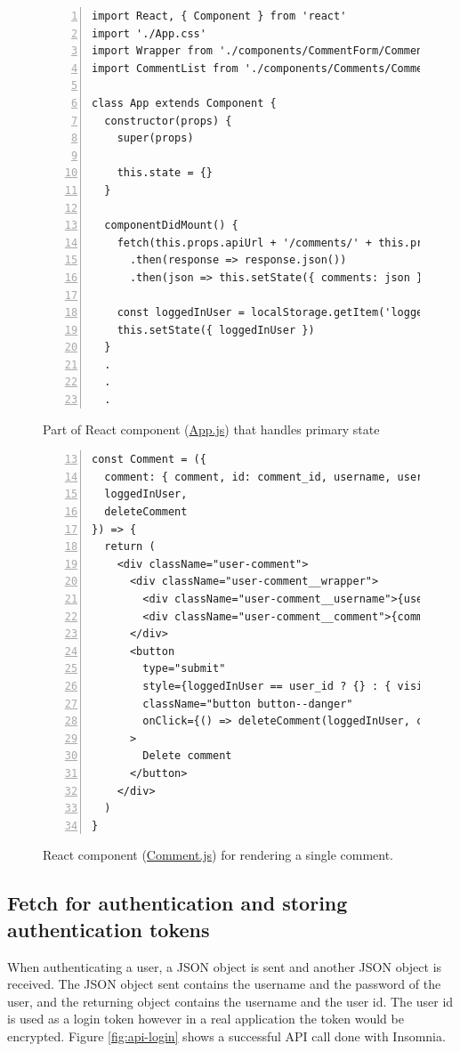 \documentclass[a4paper]{scrartcl}
\begin{document}
\begin{figure}
	\begin{lstlisting}[frame=single, numbers=left, breaklines=true, basicstyle=\ttfamily\footnotesize, firstnumber=1]
import React, { Component } from 'react'
import './App.css'
import Wrapper from './components/CommentForm/CommentFormWrapper'
import CommentList from './components/Comments/Comment'

class App extends Component {
  constructor(props) {
    super(props)

    this.state = {}
  }

  componentDidMount() {
    fetch(this.props.apiUrl + '/comments/' + this.props.recipeId)
      .then(response => response.json())
      .then(json => this.setState({ comments: json }))

    const loggedInUser = localStorage.getItem('loggedInUser')
    this.setState({ loggedInUser })
  }
  .
  .
  .
	\end{lstlisting}
	\caption{Part of React component  (\href{https://github.com/juliuscc/kth-id1354/blob/master/homework-4/front-end/tasty_temp/src/App.js}{App.js}) that handles primary state}
	\label{fig:react-container}
\end{figure}

\begin{figure}
\begin{lstlisting}[frame=single, numbers=left, breaklines=true, basicstyle=\ttfamily\footnotesize, firstnumber=13]
const Comment = ({
  comment: { comment, id: comment_id, username, user_id },
  loggedInUser,
  deleteComment
}) => {
  return (
    <div className="user-comment">
      <div className="user-comment__wrapper">
        <div className="user-comment__username">{username}</div>
        <div className="user-comment__comment">{comment}</div>
      </div>
      <button
        type="submit"
        style={loggedInUser == user_id ? {} : { visibility: 'hidden' }}
        className="button button--danger"
        onClick={() => deleteComment(loggedInUser, comment_id)}
      >
        Delete comment
      </button>
    </div>
  )
}
\end{lstlisting}
	\caption{React component (\href{https://github.com/juliuscc/kth-id1354/blob/f811132bd5cd1c4ac30e0b60e7a2f64143a6d152/homework-4/front-end/tasty-app/components/Comments/Comment.js\#L13}{Comment.js}) for rendering a single comment.}
	\label{fig:react-component}
\end{figure}

\subsection{Fetch for authentication and storing authentication tokens}
When authenticating a user, a JSON object is sent and another JSON object is received. The JSON object sent contains the username and the password of the user, and the returning object contains the username and the user id. The user id is used as a login token however in a real application the token would be encrypted. Figure \ref{fig:api-login} shows a successful API call done with Insomnia.
\end{document}
